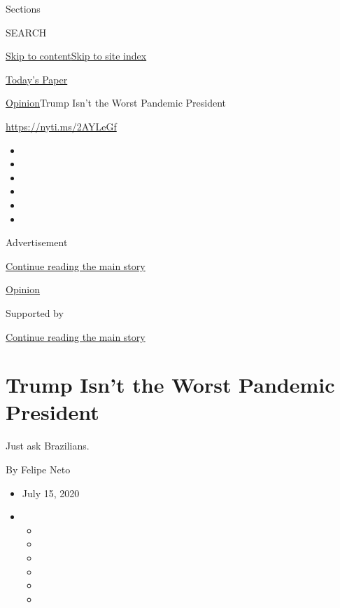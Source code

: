Sections

SEARCH

\protect\hyperlink{site-content}{Skip to
content}\protect\hyperlink{site-index}{Skip to site index}

\href{https://myaccount.nytimes3xbfgragh.onion/auth/login?response_type=cookie\&client_id=vi}{}

\href{https://www.nytimes3xbfgragh.onion/section/todayspaper}{Today's
Paper}

\href{/section/opinion}{Opinion}\textbar{}Trump Isn't the Worst Pandemic
President

\url{https://nyti.ms/2AYLeGf}

\begin{itemize}
\item
\item
\item
\item
\item
\item
\end{itemize}

Advertisement

\protect\hyperlink{after-top}{Continue reading the main story}

\href{/section/opinion}{Opinion}

Supported by

\protect\hyperlink{after-sponsor}{Continue reading the main story}

\hypertarget{trump-isnt-the-worst-pandemic-president}{%
\section{Trump Isn't the Worst Pandemic
President}\label{trump-isnt-the-worst-pandemic-president}}

Just ask Brazilians.

By Felipe Neto

\begin{itemize}
\item
  July 15, 2020
\item
  \begin{itemize}
  \item
  \item
  \item
  \item
  \item
  \item
  \end{itemize}
\end{itemize}

